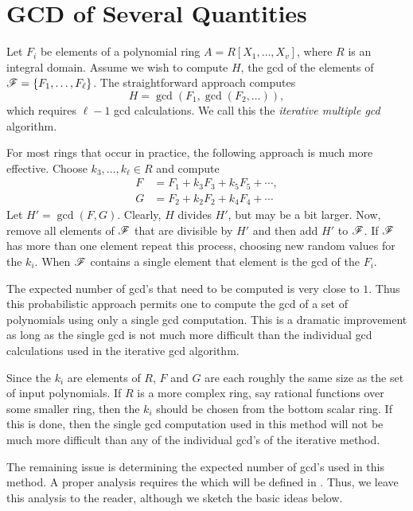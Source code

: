 \section{GCD of Several Quantities}
\label{GCD:Several:Sec}

Let $F_i$ be elements of a polynomial ring $A = R[X_1, \ldots, X_v]$,
where $R$ is an integral domain.  Assume we wish to compute $H$, the
{\sc gcd} of the elements of ${\cal F} = \{F_1, \ldots, F_{\ell}\}$.
The straightforward approach computes
\[
H = \gcd(F_1, \gcd(F_2, \ldots)),
\]
which requires $\ell - 1$ {\sc gcd} calculations.  We call this the
{\em iterative multiple {\sc gcd}} algorithm.

For most rings that occur in practice, the following approach is much
more effective.  Choose $k_3, \ldots, k_{\ell} \in R$ and compute
\[
\begin{aligned}
F & = F_1 + k_3 F_3 + k_5 F_5 + \cdots, \\
G & = F_2 + k_2 F_2 + k_4 F_4 + \cdots
\end{aligned}
\]
Let $H' = \gcd(F, G)$.  Clearly, $H$ divides $H'$, but may be a bit
larger.  Now, remove all elements of ${\cal F}$ that are divisible by
$H'$ and then add $H'$ to ${\cal F}$.  If ${\cal F}$ has more than one
element repeat this process, choosing new random values for the $k_i$.
When ${\cal F}$ contains a single element that element is the {\sc
gcd} of the $F_i$.

The expected number of {\sc gcd}'s that need to be computed is very
close to $1$.  Thus this probabilistic approach permits one to compute
the {\sc gcd} of a set of polynomials using only a single {\sc gcd}
computation. 
This is a dramatic improvement as long as the single {\sc gcd} is not
much more difficult than the individual {\sc gcd} calculations used in
the iterative {\sc gcd} algorithm.

Since the $k_i$ are elements of $R$, $F$ and $G$ are each roughly the
same size as the set of input polynomials.  If $R$ is a more complex
ring, say rational functions over some smaller ring, then the $k_i$
should be chosen from the bottom scalar ring.  If this is done, then
the single {\sc gcd} computation used in this method will not be much
more difficult than any of the individual {\sc gcd}'s of the iterative
method.

The remaining issue is determining the expected number of {\sc gcd}'s
used in this method.  A proper analysis requires the
 which will be defined in
.  Thus, we leave this analysis to the
reader, although we sketch the basic ideas below.  

